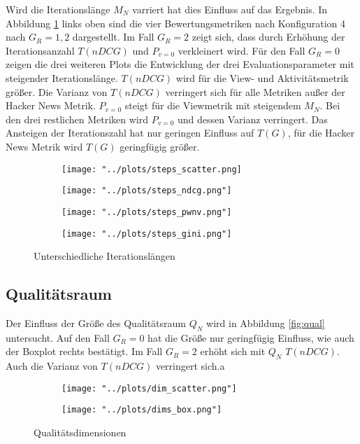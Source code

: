 Wird die Iterationslänge $M_N$ varriert hat dies Einfluss auf das Ergebnis. In Abbildung \ref{fig:steps} links oben sind die vier Bewertungsmetriken nach Konfiguration 4 nach $G_R = {1,2}$ dargestellt. Im Fall $G_R = 2$ zeigt sich, dass durch Erhöhung der Iterationsanzahl $T(nDCG)$ und $P_{v=0}$ verkleinert wird. Für den Fall $G_R = 0$ zeigen die drei weiteren Plots die Entwicklung der drei Evaluationsparameter mit steigender Iterationslänge. $T(nDCG)$ wird für die View- und Aktivitätsmetrik größer. Die Varianz von $T(nDCG)$ verringert sich für alle Metriken außer der Hacker News Metrik. $P_{v=0}$ steigt für die Viewmetrik mit steigendem $M_N$. Bei den drei restlichen Metriken wird $P_{v=0}$ und dessen Varianz verringert. Das Ansteigen der Iterationszahl hat nur geringen Einfluss auf $T(G)$, für die Hacker News Metrik wird $T(G)$ geringfügig größer. 


\begin{figure}[!htb]
	\begin{subfigure}{0.5\textwidth}
		\texttt{[image: "../plots/steps\_scatter.png]}%
	\end{subfigure}
	\hfill
	\begin{subfigure}{0.5\textwidth}
		
		
		\texttt{[image: "../plots/steps\_ndcg.png"]}%

	\end{subfigure}
	\begin{subfigure}{0.5\textwidth}
		\texttt{[image: "../plots/steps\_pwnv.png"]}%
	\end{subfigure}
	\hfill
	\begin{subfigure}{0.5\textwidth}
		\texttt{[image: "../plots/steps\_gini.png"]}%
	\end{subfigure}
	\caption{Unterschiedliche Iterationslängen}
	\label{fig:steps}
\end{figure}

\subsection{Qualitätsraum}

Der Einfluss der Größe des Qualitätsraum $Q_N$ wird in Abbildung \ref{fig:qual} untersucht. 
Auf den Fall $G_R = 0$ hat die Größe nur geringfügig Einfluss, wie auch der Boxplot rechts bestätigt. Im Fall $G_R = 2$ erhöht sich mit $Q_N$ $T(nDCG)$. Auch die Varianz von $T(nDCG)$ verringert sich.a

\begin{figure}[!h]
	\label{fig:qual}	
	\begin{subfigure}{0.5\textwidth}
		\texttt{[image: "../plots/dim\_scatter.png"]}
	\end{subfigure}
	\begin{subfigure}{0.5\textwidth}
		\texttt{[image: "../plots/dims\_box.png"]}
	\end{subfigure}
	\caption{Qualitätsdimensionen}
\end{figure}


